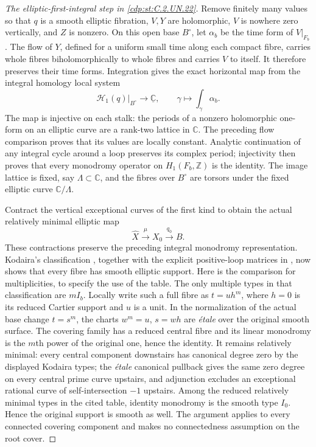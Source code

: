 \begin{proof}[The elliptic-first-integral step in \ref{cdp:st:C.2.UN.22}]
Remove finitely many values so that $q$ is a smooth
elliptic fibration, $V,Y$ are holomorphic, $V$ is nowhere
zero vertically, and $Z$ is nonzero.  On this open base
$B^\circ$, let $\alpha_b$ be the time form of $V|_{F_b}$.
The flow of $Y$, defined for a uniform small time along
each compact fibre, carries whole fibres biholomorphically
to whole fibres and carries $V$ to itself.  It therefore
preserves their time forms.  Integration gives the exact
horizontal map from the integral homology local system
\[
 \mathcal H_1(q)\big|_{B^\circ}
   \longrightarrow\underline{\mathbb C},
 \qquad
 \gamma\longmapsto\int_\gamma\alpha_b.
 \tag{C.RF.2}\label{cdp:eq:C.RF.2}
\]
The map is injective on each stalk: the periods of a
nonzero holomorphic one-form on an elliptic curve are a
rank-two lattice in $\mathbb C$.  The preceding flow
comparison proves that its values are locally constant.
Analytic continuation of any integral cycle around a
loop preserves its complex period; injectivity then
proves that every monodromy operator on $H_1(F_b,\mathbb Z)$
is the identity.  The image lattice is fixed, say
$\Lambda\subset\mathbb C$, and the fibres over
$B^\circ$ are torsors under the fixed elliptic curve
$\mathbb C/\Lambda$.

Contract the vertical exceptional curves of the first
kind to obtain the actual relatively minimal elliptic
map
\[
 \widehat X\xrightarrow{\ \mu\ }X_0
       \xrightarrow{\ q_0\ }B.
 \tag{C.RF.3}\label{cdp:eq:C.RF.3}
\]
These contractions preserve the preceding integral
monodromy representation.  Kodaira's classification
\cite[Theorem~6.2, pp.~564--566; Section~8(iv)(11), p.~585]{Kodaira1963II}, together with the explicit positive-loop matrices in \citet[Section~2.3, pp.~5--6]{UlmerUrzua2021},
now shows that every fibre has smooth elliptic support.
Here is the comparison for multiplicities, to specify
the use of the table.  The only multiple types in that
classification are $mI_b$.  Locally write such a full
fibre as $t=u h^m$, where $h=0$ is its reduced Cartier
support and $u$ is a unit.  In the normalization of the
actual base change $t=s^m$, the charts
$w^m=u$, $s=wh$ are \emph{\'etale} over the original
smooth surface.  The covering family has a reduced
central fibre and its linear monodromy is the $m$th
power of the original one, hence the identity.  It
remains relatively minimal: every central component
downstairs has canonical degree zero by the displayed
Kodaira types; the \emph{\'etale} canonical pullback
gives the same zero degree on every central prime
curve upstairs, and adjunction excludes an exceptional
rational curve of self-intersection $-1$ upstairs.
Among the reduced relatively minimal types in the
cited table, identity monodromy is the smooth type
$I_0$.  Hence the original support is smooth as well.
The argument applies to every connected covering
component and makes no connectedness assumption on
the root cover.


\end{proof}
